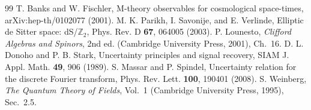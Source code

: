 \documentclass[aps,prd,twocolumn,superscriptaddress,nofootinbib]{revtex4-2}
\begin{document}
\begin{thebibliography}{99}
 T. Banks and W. Fischler, M-theory observables for cosmological space-times, arXiv:hep-th/0102077 (2001).
 M. K. Parikh, I. Savonije, and E. Verlinde, Elliptic de Sitter space: dS/$\mathbb{Z}_2$, Phys. Rev. D \textbf{67}, 064005 (2003).
 P. Lounesto, \emph{Clifford Algebras and Spinors}, 2nd ed. (Cambridge University Press, 2001), Ch.~16.
 D. L. Donoho and P. B. Stark, Uncertainty principles and signal recovery, SIAM J. Appl. Math. \textbf{49}, 906 (1989).
 S. Massar and P. Spindel, Uncertainty relation for the discrete Fourier transform, Phys. Rev. Lett. \textbf{100}, 190401 (2008).
 S. Weinberg, \emph{The Quantum Theory of Fields}, Vol.~1 (Cambridge University Press, 1995), Sec.~2.5.
\end{thebibliography}
\end{document}
